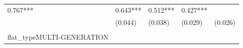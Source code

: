 \documentclass[]{book}
\begin{document}
\begin{longtable}[]{@{}lllll@{}}
\begin{minipage}[t]{0.17\columnwidth}
0.767***\strut
\end{minipage} & \begin{minipage}[t]{0.17\columnwidth}\raggedright\strut
0.643***\strut
\end{minipage} & \begin{minipage}[t]{0.18\columnwidth}\raggedright\strut
0.512***\strut
\end{minipage} & \begin{minipage}[t]{0.18\columnwidth}\raggedright\strut
0.427***\strut
\end{minipage}\tabularnewline
\begin{minipage}[t]{0.15\columnwidth}\raggedright\strut
\strut
\end{minipage} & \begin{minipage}[t]{0.17\columnwidth}\raggedright\strut
(0.044)\strut
\end{minipage} & \begin{minipage}[t]{0.17\columnwidth}\raggedright\strut
(0.038)\strut
\end{minipage} & \begin{minipage}[t]{0.18\columnwidth}\raggedright\strut
(0.029)\strut
\end{minipage} & \begin{minipage}[t]{0.18\columnwidth}\raggedright\strut
(0.026)\strut
\end{minipage}\tabularnewline
\begin{minipage}[t]{0.15\columnwidth}\raggedright\strut
\strut
\end{minipage} & \begin{minipage}[t]{0.17\columnwidth}\raggedright\strut
\strut
\end{minipage} & \begin{minipage}[t]{0.17\columnwidth}\raggedright\strut
\strut
\end{minipage} & \begin{minipage}[t]{0.18\columnwidth}\raggedright\strut
\strut
\end{minipage} & \begin{minipage}[t]{0.18\columnwidth}\raggedright\strut
\strut
\end{minipage}\tabularnewline
\begin{minipage}[t]{0.15\columnwidth}\raggedright\strut
flat\_typeMULTI-GENERATION\strut
\end{minipage} & \begin{minipage}[t]{0.17\columnwidth}\raggedright\strut
\strut
\end{minipage} & \begin{minipage}[t]{0.17\columnwidth}\raggedright\strut

\end{minipage}
\end{longtable}
\end{document}
